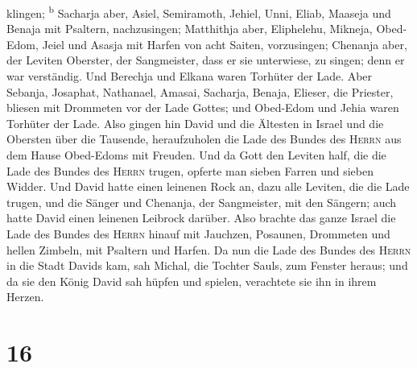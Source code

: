 klingen; \textsuperscript{b}  Sacharja aber, Asiel,
Semiramoth, Jehiel, Unni, Eliab, Maaseja und Benaja mit Psaltern,
nachzusingen;  Matthithja aber, Eliphelehu, Mikneja,
Obed-Edom, Jeiel und Asasja mit Harfen von acht Saiten, vorzusingen;
 Chenanja aber, der Leviten Oberster, der Sangmeister,
dass er sie unterwiese, zu singen; denn er war verständig.
 Und Berechja und Elkana waren Torhüter der Lade.
 Aber Sebanja, Josaphat, Nathanael, Amasai, Sacharja,
Benaja, Elieser, die Priester, bliesen mit Drommeten vor der Lade
Gottes; und Obed-Edom und Jehia waren Torhüter der Lade. 
Also gingen hin David und die Ältesten in Israel und die Obersten über
die Tausende, heraufzuholen die Lade des Bundes des \textsc{Herrn} aus
dem Hause Obed-Edoms mit Freuden.  Und da Gott den
Leviten half, die die Lade des Bundes des \textsc{Herrn} trugen, opferte
man sieben Farren und sieben Widder.  Und David hatte
einen leinenen Rock an, dazu alle Leviten, die die Lade trugen, und die
Sänger und Chenanja, der Sangmeister, mit den Sängern; auch hatte David
einen leinenen Leibrock darüber.  Also brachte das ganze
Israel die Lade des Bundes des \textsc{Herrn} hinauf mit Jauchzen,
Posaunen, Drommeten und hellen Zimbeln, mit Psaltern und Harfen.
 Da nun die Lade des Bundes des \textsc{Herrn} in die
Stadt Davids kam, sah Michal, die Tochter Sauls, zum Fenster heraus; und
da sie den König David sah hüpfen und spielen, verachtete sie ihn in
ihrem Herzen.

\hypertarget{section-15}{%
\section{16}\label{section-15}}


